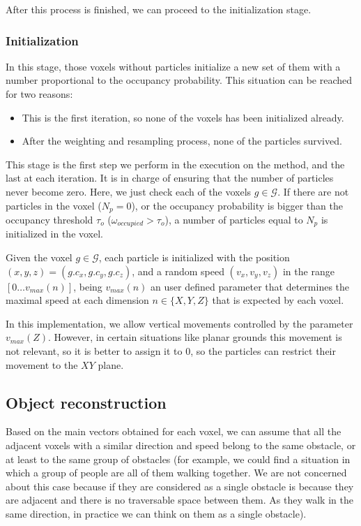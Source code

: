 After this process is finished, we can proceed to the initialization stage.

\subsubsection{Initialization}\label{ch:chapter05_01_04_03}

In this stage, those voxels without particles initialize a new set of them with a number proportional to the occupancy probability. This situation can be reached for two reasons:
\begin{itemize}
 \item This is the first iteration, so none of the voxels has been initialized already.
 \item After the weighting and resampling process, none of the particles survived.
\end{itemize}

This stage is the first step we perform in the execution on the method, and the last at each iteration. It is in charge of ensuring that the number of particles never become zero. Here, we just check each of the voxels $g \in \mathcal{G}$. If there are not particles in the voxel ($N_p = 0$), or the occupancy probability is bigger than the occupancy threshold $\tau_{o}$ ($\omega_{occupied} > \tau_{o}$), a number of particles equal to $N_p$ is initialized in the voxel.

Given the voxel $g \in \mathcal{G}$, each particle is initialized with the position $(x, y, z) = (g.c_x, g.c_y, g.c_z)$, and a random speed $(v_x, v_y, v_z)$ in the range $[0\dots v_{max}(n)]$, being $v_{max}(n)$ an user defined parameter that determines the maximal speed at each dimension $n \in \{ X, Y, Z\}$ that is expected by each voxel. 

In this implementation, we allow vertical movements controlled by the parameter $v_{max}(Z)$. However, in certain situations like planar grounds this movement is not relevant, so it is better to assign it to $0$, so the particles can restrict their movement to the $XY$ plane.

\subsection{Object reconstruction}\label{ch:chapter05_01_05}

Based on the main vectors obtained for each voxel, we can assume that all the adjacent voxels with a similar direction and speed belong to the same obstacle, or at least to the same group of obstacles (for example, we could find a situation in which a group of people are all of them walking together. We are not concerned about this case because if they are considered as a single obstacle is because they are adjacent and there is no traversable space between them. As they walk in the same direction, in practice we can think on them as a single obstacle).

